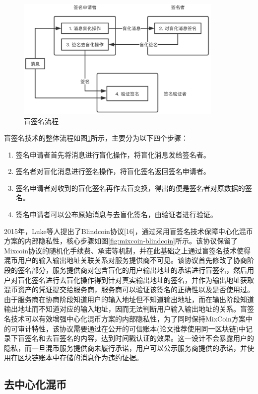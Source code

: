\begin{figure}
\centering
\includegraphics[width=10cm]{figures/blind-sig.png}
\caption{盲签名流程}
\label{fig:blind-sig}
\end{figure}

盲签名技术的整体流程如图\ref{fig:blind-sig}所示，主要分为以下四个步骤：

\begin{enumerate}
	\item 签名申请者首先将消息进行盲化操作，将盲化消息发给签名者。
	\item 签名者对盲化消息进行签名操作，将盲化签名返回签名申请者。
	\item 签名申请者对收到的盲化签名再作去盲变换，得出的便是签名者对原数据的签名。
	\item 签名申请者可以公布原始消息与去盲化签名，由验证者进行验证。
\end{enumerate}

2015年，Luke等人提出了Blindcoin协议[16]，通过采用盲签名技术保障中心化混币方案的内部隐私性，核心步骤如图\ref{fig:mixcoin-blindcoin}所示。该协议保留了Mixcoin协议的随机化手续费、承诺等机制，并在此基础之上通过盲签名技术使得混币用户的输入输出地址关联关系对服务提供商不可见。该协议首先修改了协商阶段的签名部分，服务提供商对包含盲化的用户输出地址的承诺进行盲签名，然后用户对盲化签名进行去盲化操作得到针对真实输出地址的签名，并作为输出地址获取混币资产的凭证提交给服务商，服务商可以验证该签名的正确性以及是否使用过。由于服务商在协商阶段知道用户的输入地址但不知道输出地址，而在输出阶段知道输出地址而不知道对应的输入地址，因而无法判断用户输入输出地址的关系。盲签名技术可以有效增强中心化混币方案的内部隐私性，为了同时保持MixCoin方案中的可审计特性，该协议需要通过在公开的可信账本(论文推荐使用同一区块链)中记录下盲签名和去盲签名的内容，达到时间戳认证的效果。这一设计不会暴露用户的隐私，而一旦混币服务提供商未履行承诺，用户可以公示服务商提供的承诺，并使用在区块链账本中存储的消息作为违约证据。

\subsection{去中心化混币}

